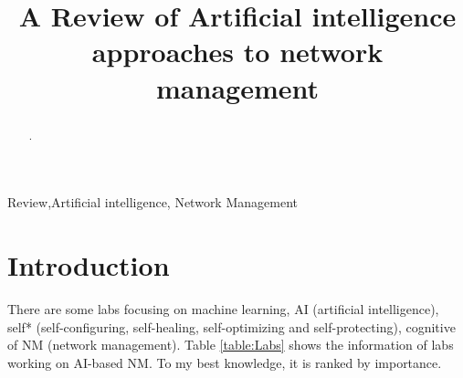 \documentclass[journal,UTF8]{IEEEtran}
\begin{document}
\title{A Review of Artificial intelligence approaches to network management}

\maketitle

% 
% 
\begin{abstract}
.
 

\end{abstract}

\begin{IEEEkeywords}
Review,Artificial intelligence, Network Management
\end{IEEEkeywords}

%
\IEEEpeerreviewmaketitle



\section{Introduction}
There are some labs focusing on machine learning, AI (artificial intelligence), self* (self-configuring, self-healing, self-optimizing and self-protecting), cognitive of NM (network management). Table \ref{table:Labs} shows the information of labs working on AI-based NM. To my best knowledge, it is ranked by importance.
\end{document}
